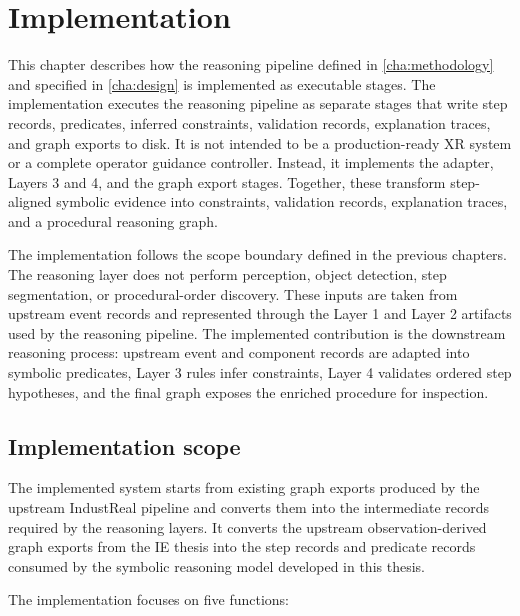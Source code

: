 \chapter{Implementation}
\label{cha:implementation}

This chapter describes how the reasoning pipeline defined in \cref{cha:methodology} and specified in \cref{cha:design} is implemented as executable stages. The implementation executes the reasoning pipeline as separate stages that write step records, predicates, inferred constraints, validation records, explanation traces, and graph exports to disk. It is not intended to be a production-ready XR system or a complete operator guidance controller. Instead, it implements the adapter, Layers 3 and 4, and the graph export stages. Together, these transform step-aligned symbolic evidence into constraints, validation records, explanation traces, and a procedural reasoning graph.

The implementation follows the scope boundary defined in the previous chapters. The reasoning layer does not perform perception, object detection, step segmentation, or procedural-order discovery. These inputs are taken from upstream event records and represented through the Layer 1 and Layer 2 artifacts used by the reasoning pipeline. The implemented contribution is the downstream reasoning process: upstream event and component records are adapted into symbolic predicates, Layer 3 rules infer constraints, Layer 4 validates ordered step hypotheses, and the final graph exposes the enriched procedure for inspection.



\section{Implementation scope}
\label{sec:implementation-scope}

 The implemented system starts from existing graph exports produced by the upstream IndustReal pipeline and converts them into the intermediate records required by the reasoning layers. It converts the upstream observation-derived graph exports from the IE thesis into the step records and predicate records consumed by the symbolic reasoning model developed in this thesis.

The implementation focuses on five functions:

